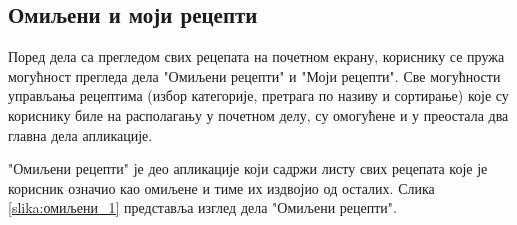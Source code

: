 \documentclass[12pt,oneside]{memoir}
\begin{document}
\subsection{Омиљени и моји рецепти}

\indent Поред дела са прегледом свих рецепата на почетном екрану, кориснику се пружа могућност прегледа дела "Омиљени рецепти" и "Моји рецепти". Све могућности управљања рецептима (избор категорије, претрага по називу и сортирање) које су кориснику биле на располагању у почетном делу, су омогућене и у преостала два главна дела апликације.

\indent "Омиљени рецепти" је део апликације који садржи листу свих рецепата које је корисник означио као омиљене и тиме их издвојио од осталих. Слика \ref{slika:омиљени_1} представља изглед дела "Омиљени рецепти".
\end{document}
